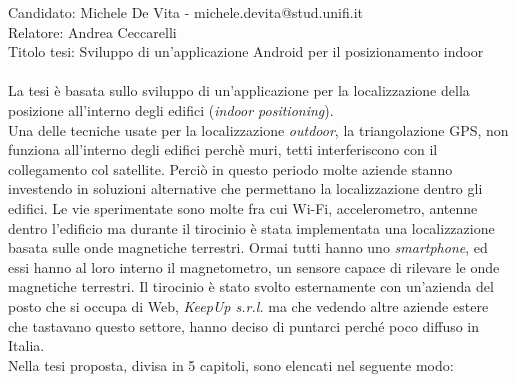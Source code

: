 \documentclass[10pt,a4paper]{article}
\begin{document}
	\noindent
	Candidato: Michele De Vita - michele.devita@stud.unifi.it\\
	Relatore: Andrea Ceccarelli\\
	Titolo tesi: Sviluppo di un'applicazione Android per il posizionamento indoor\\\\
	\noindent
	La tesi \`e basata sullo sviluppo di un'applicazione per la localizzazione della posizione all'interno degli edifici (\textit{indoor positioning}).\\  Una delle tecniche usate per la localizzazione \textit{outdoor}, la triangolazione GPS, non funziona all'interno degli edifici perch\`e muri, tetti  interferiscono con il collegamento col satellite. Perci\`o in questo periodo molte aziende stanno investendo in soluzioni alternative che permettano la localizzazione dentro gli edifici. Le vie sperimentate sono molte fra cui Wi-Fi, accelerometro, antenne dentro l'edificio ma durante il tirocinio  \`e stata implementata una localizzazione basata sulle onde magnetiche terrestri. Ormai tutti hanno uno \textit{smartphone}, ed essi hanno al loro interno il magnetometro, un sensore capace di rilevare le onde magnetiche terrestri. Il tirocinio \`e stato svolto esternamente con un'azienda del posto che si occupa di Web, \textit{KeepUp s.r.l.} ma che vedendo altre aziende estere che tastavano questo settore, hanno deciso di puntarci perch\'e poco diffuso in Italia.\\
	\noindent
	Nella tesi proposta, divisa in 5 capitoli, sono elencati nel seguente modo:
\end{document}
